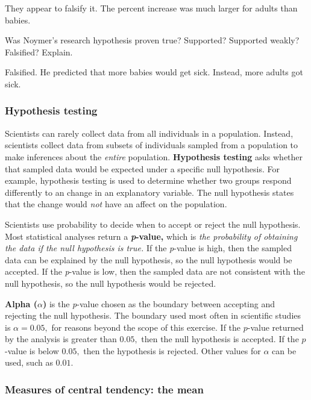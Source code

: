 \documentclass[12pt]{exam}
\newcommand*\AnswerBox[2]{%
    \parbox[t][#1]{0.92\textwidth}{%
    \begin{solution}#2\end{solution}}
}
\begin{document}
\begin{questions}
\AnswerBox{2\baselineskip}{%
They appear to falsify it. The percent increase was much larger for adults than babies.
}

\question
Was Noymer's research hypothesis proven true? Supported? Supported
weakly? Falsified? Explain.

\AnswerBox{2\baselineskip}{%
Falsified. He predicted that more babies would get sick. Instead, more adults got sick.
}

\subsubsection*{Hypothesis testing}

Scientists can rarely collect data from all individuals in a population. Instead, scientists collect data from subsets of individuals sampled from a population to make inferences about the \emph{entire} population. \textbf{Hypothesis testing} asks whether that sampled data would be expected under a specific null hypothesis. For example, hypothesis testing is used to determine whether two groups respond differently to an change in an explanatory variable. The null hypothesis states that the change would \emph{not} have an affect on the population.

Scientists use probability to decide when to accept or reject the null hypothesis. Most statistical analyses return a \textbf{\textit{p}-value,} which is \emph{the probability of obtaining the data if the null hypothesis is true.} If the \textit{p}-value is high, then the sampled data can be explained by the null hypothesis, so the null hypothesis would be accepted. If the \textit{p}-value is low, then the sampled data are not consistent with the null hypothesis, so the null hypothesis would be rejected.

\textbf{Alpha ($\alpha$)} is the \textit{p}-value chosen as the boundary between accepting and rejecting the null hypothesis. The boundary used most often in scientific studies is $\alpha = 0.05,$ for reasons beyond the scope of this exercise. If the $p$-value returned by the analysis is greater than $0.05,$ then the null hypothesis is accepted. If the $p$-value is below $0.05,$ then the hypothesis is rejected. Other values for $\alpha$ can be used, such as $0.01.$

\subsubsection*{Measures of central tendency: the mean}


\end{questions}
\end{document}
